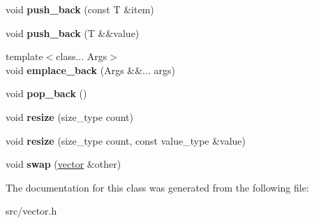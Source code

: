 \begin{DoxyCompactItemize}
void {\bfseries push\+\_\+back} (const T \&item)
\item 
\mbox{\label{classvector_a38d807015ecd56526ca3ae6811ab2b4d}} 
void {\bfseries push\+\_\+back} (T \&\&value)
\item 
\mbox{\label{classvector_af48ef7dda99019486fbfd87cb85ee209}} 
{\footnotesize template$<$class... Args$>$ }\\void {\bfseries emplace\+\_\+back} (Args \&\&... args)
\item 
\mbox{\label{classvector_ae7bd06c29fa3577b162de40b20bc9232}} 
void {\bfseries pop\+\_\+back} ()
\item 
\mbox{\label{classvector_aa67dd01fe91c5189336bed8b4ce4965b}} 
void {\bfseries resize} (size\+\_\+type count)
\item 
\mbox{\label{classvector_ae03922e44d3c1bcc8ea6f3cde8ab7592}} 
void {\bfseries resize} (size\+\_\+type count, const value\+\_\+type \&value)
\item 
\mbox{\label{classvector_a2705289c4e3ee87c6b69f4a3c295017f}} 
void {\bfseries swap} (\mbox{\hyperlink{classvector}{vector}} \&other)
\end{DoxyCompactItemize}


The documentation for this class was generated from the following file\+:\begin{DoxyCompactItemize}
\item 
src/vector.\+h\end{DoxyCompactItemize}
